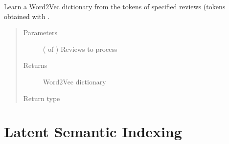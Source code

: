 \documentclass[letterpaper,10pt,english]{sphinxmanual}
\begin{document}
\begin{fulllineitems}
\label{\detokenize{learning:loacore.learning.word2vec.word_2_vec}}
Learn a Word2Vec dictionary from the tokens of specified reviews (tokens obtained with {\hyperref[\detokenize{learning:loacore.learning.word2vec.get_tokens_list}]{}} .
\begin{quote}\begin{description}
\item[{Parameters}] \leavevmode
{} ( of {\hyperref[\detokenize{classes:loacore.classes.classes.Review}]{}}) \textendash{} Reviews to process

\item[{Returns}] \leavevmode
Word2Vec dictionary

\item[{Return type}] \leavevmode



\end{description}\end{quote}

\end{fulllineitems}



\section{Latent Semantic Indexing}
\label{\detokenize{learning:module-loacore.learning.lsi}}\label{\detokenize{learning:latent-semantic-indexing}}
\end{document}
